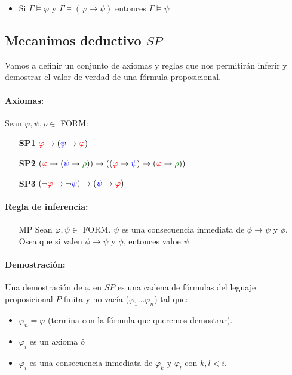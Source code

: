 	\begin{itemize}

		\item Si $\Gamma\vDash\varphi$ y $\Gamma\vDash(\varphi \rightarrow \psi)$ entonces $\Gamma\vDash\psi$
\end{itemize}

\subsection{Mecanimos deductivo $SP$}
Vamos a definir un conjunto de axiomas y reglas que nos permitirán inferir y demostrar el valor de verdad de una fórmula proposicional.

\paragraph{Axiomas:} Sean $\varphi,\psi,\rho\in$ FORM:
\begin{itemize}
	\item[\textbf{SP1}] ${\color{red}\varphi}\rightarrow({\color{blue}\psi}\rightarrow {\color{red}\varphi})$
	\item[\textbf{SP2}] $\spdos{\varphi}{\psi}{\rho}$
	\item[\textbf{SP3}]$(\lnot{\color{red}\varphi}\rightarrow\lnot{\color{blue}\psi})\rightarrow({\color{blue}\psi}\rightarrow{\color{red}\varphi})$  
\end{itemize}

\paragraph{Regla de inferencia:}
\begin{itemize}
	\item[MP] Sean $\varphi,\psi\in$ FORM. $\psi$ es una consecuencia inmediata de $\phi\rightarrow\psi$ y $\phi$. Osea que si valen $\phi\rightarrow\psi$ y $\phi$, entonces valoe $\psi$.
\end{itemize}

\paragraph{Demostración:} Una demostración de $\varphi$ en $SP$ es una cadena de fórmulas del leguaje proposicional  $P$ finita y no vacía ($\varphi_1\dots\varphi_n$) tal que:
\begin{itemize}
	\item $\varphi_n = \varphi$ (termina con la fórmula que queremos demostrar).
	\item $\varphi_i$ es un axioma ó
	\item $\varphi_i$ es una consecuencia inmediata de $\varphi_k$ y $\varphi_l$ con $k,l < i$.
\end{itemize}

